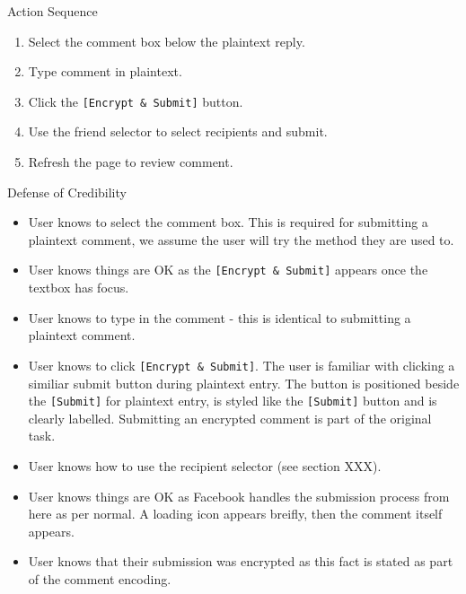 \begin{desc}

    \item[Action Sequence] \hfill
    \begin{enumerate}
        \item Select the comment box below the plaintext reply.
        \item Type comment in plaintext.
        \item Click the {\tt [Encrypt \& Submit]} button.
        \item Use the friend selector to select recipients and submit.
        \item Refresh the page to review comment.
    \end{enumerate}
    
    \item[Defense of Credibility] \hfill
        \begin{itemize}
            
            \item User knows to select the comment box. This is required for submitting a plaintext comment, we assume the user will try the method they are used to.
            
            \item User knows things are OK as the {\tt [Encrypt \& Submit]} appears once the textbox has focus.
            
            \item User knows to type in the comment - this is identical to submitting a plaintext comment.
            
            \item User knows to click {\tt [Encrypt \& Submit]}. The user is familiar with clicking a similiar submit button during plaintext entry. The button is positioned beside the {\tt [Submit]} for plaintext entry, is styled like the {\tt [Submit]} button and is clearly labelled. Submitting an encrypted comment is part of the original task.
            
            \item User knows how to use the recipient selector (see section XXX).
            
            \item User knows things are OK as Facebook handles the submission process from here as per normal. A loading icon appears breifly, then the comment itself appears.
            
            \item User knows that their submission was encrypted as this fact is stated as part of the comment encoding.
            

\end{itemize}
\end{desc}
